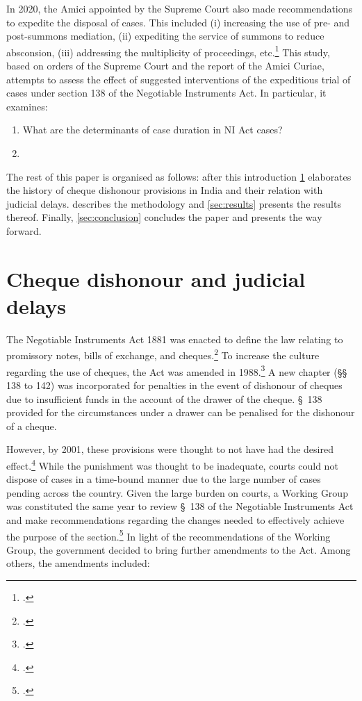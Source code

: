 In 2020, the Amici appointed by the Supreme Court also made recommendations to expedite the disposal of cases. This included (i) increasing the use of pre- and post-summons mediation, (ii) expediting the service of summons to reduce absconsion, (iii) addressing the multiplicity of proceedings, etc.\footcite{amicus2020_submission} This study, based on orders of the Supreme Court and the report of the Amici Curiae, attempts to assess the effect of suggested interventions of the expeditious trial of cases under section 138 of the Negotiable Instruments Act. In particular, it examines:

\begin{enumerate}
 \item What are the determinants of case duration in NI Act cases?
 \item 
\end{enumerate}

The rest of this paper is organised as follows: after this introduction \cref{sec:history} elaborates the history of cheque dishonour provisions in India and their relation with judicial delays.  describes the methodology and \cref{sec:results} presents the results thereof. Finally, \cref{sec:conclusion} concludes the paper and presents the way forward.

\section{Cheque dishonour and judicial delays}
\label{sec:history}

The Negotiable Instruments Act 1881 was enacted to define the law relating to promissory notes, bills of exchange, and cheques.\footcite{ind1881_niAct} To increase the culture regarding the use of cheques, the Act was amended in 1988.\footcite{niAmend1988} A new chapter (\S\S~ 138 to 142)  was incorporated for penalties in the event of dishonour of cheques due to insufficient funds in the account of the drawer of the cheque. \S~138 provided for the circumstances under a drawer can be penalised for the dishonour of a cheque.

However, by 2001, these provisions were thought to not have had the desired effect.\footcite{stdcomm2001_138niAct} While the punishment was thought to be inadequate, courts could not dispose of cases in a time-bound manner due to the large number of cases pending across the country. Given the large burden on courts, a Working Group was constituted the same year to review \S~138 of the Negotiable Instruments Act and make recommendations regarding the changes needed to effectively achieve the purpose of the section.\footcite{wg2001_138} In light of the recommendations of the Working Group, the government decided to bring further amendments to the Act. Among others, the amendments included:

